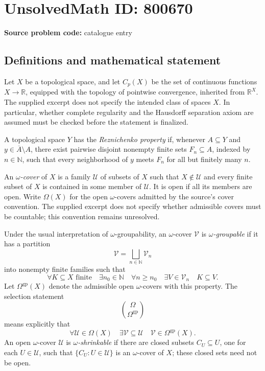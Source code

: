 \documentclass[11pt]{article}
\newcommand{\N}{\mathbb{N}}
\newcommand{\R}{\mathbb{R}}
\begin{document}
\section*{UnsolvedMath ID: 800670}
\textbf{Source problem code:} catalogue entry
\subsection{Definitions and mathematical statement}
Let \(X\) be a topological space, and let \(C_p(X)\) be the set of continuous functions \(X\to\R\), equipped with the topology of pointwise convergence, inherited from \(\R^X\). The supplied excerpt does not specify the intended class of spaces \(X\). In particular, whether complete regularity and the Hausdorff separation axiom are assumed must be checked before the statement is finalized.

A topological space \(Y\) has the \emph{Reznichenko property} if, whenever \(A\subseteq Y\) and \(y\in\overline{A}\setminus A\), there exist pairwise disjoint nonempty finite sets \(F_n\subseteq A\), indexed by \(n\in\N\), such that every neighborhood of \(y\) meets \(F_n\) for all but finitely many \(n\).

An \emph{\(\omega\)-cover} of \(X\) is a family \(\mathcal U\) of subsets of \(X\) such that \(X\notin\mathcal U\) and every finite subset of \(X\) is contained in some member of \(\mathcal U\). It is open if all its members are open. Write \(\Omega(X)\) for the open \(\omega\)-covers admitted by the source's cover convention. The supplied excerpt does not specify whether admissible covers must be countable; this convention remains unresolved.

Under the usual interpretation of \(\omega\)-groupability, an \(\omega\)-cover \(\mathcal V\) is \emph{\(\omega\)-groupable} if it has a partition
\[
\mathcal V=\bigsqcup_{n\in\N}\mathcal V_n
\]
into nonempty finite families such that
\[
\forall K\subseteq X\text{ finite}\quad
\exists n_0\in\N\quad
\forall n\ge n_0\quad
\exists V\in\mathcal V_n\quad K\subseteq V.
\]
Let \(\Omega^{\mathrm{gp}}(X)\) denote the admissible open \(\omega\)-covers with this property. The selection statement
\[
\binom{\Omega}{\Omega^{\mathrm{gp}}}
\]
means explicitly that
\[
\forall\mathcal U\in\Omega(X)\quad
\exists\mathcal V\subseteq\mathcal U\quad
\mathcal V\in\Omega^{\mathrm{gp}}(X).
\]
An open \(\omega\)-cover \(\mathcal U\) is \emph{\(\omega\)-shrinkable} if there are closed subsets \(C_U\subseteq U\), one for each \(U\in\mathcal U\), such that \(\{C_U:U\in\mathcal U\}\) is an \(\omega\)-cover of \(X\); these closed sets need not be open.
\end{document}
